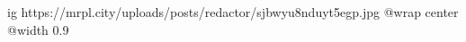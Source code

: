  
 
 
 
 

\ifcmt
  ig https://mrpl.city/uploads/posts/redactor/sjbwyu8nduyt5egp.jpg
  @wrap center
  @width 0.9
\fi
